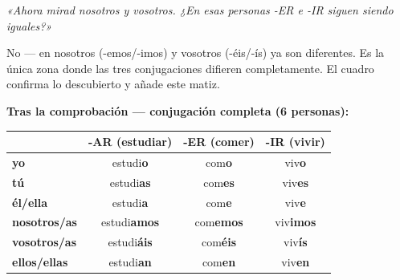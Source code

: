 \documentclass[a4paper,10pt]{article}
\renewcommand{\arraystretch}{1.3}
\newcommand{\raiz}[1]{\textcolor{azulraiz}{#1}}
\newcommand{\termin}[1]{\textcolor{rojofinal}{\textbf{#1}}}
\begin{document}
\vspace{0.3cm}

\begin{preguntabox}
\centering\large\textit{«Ahora mirad nosotros y vosotros. ¿En esas personas -ER e -IR siguen siendo iguales?»}
\end{preguntabox}

\vspace{0.3cm}

\begin{estrategiabox}
{\small No — en nosotros (-emos/-imos) y vosotros (-éis/-ís) ya son diferentes. Es la única zona donde las tres conjugaciones difieren completamente. El cuadro confirma lo descubierto y añade este matiz.}
\end{estrategiabox}

\vspace{0.4cm}

\noindent\textcolor{azulprincipal}{\textbf{Tras la comprobación — conjugación completa (6 personas):}}

\vspace{0.3cm}

\begin{center}
\renewcommand{\arraystretch}{1.7}
\begin{tabular}{|>{\bfseries}l|c|c|c|}
\hline
\rowcolor{azulprincipal!15}
& \textbf{-AR (estudiar)} & \textbf{-ER (comer)} & \textbf{-IR (vivir)} \\
\hline
yo & \raiz{estudi}\termin{o} & \raiz{com}\termin{o} & \raiz{viv}\termin{o} \\
\hline
\rowcolor{gris}
tú & \raiz{estudi}\termin{as} & \raiz{com}\termin{es} & \raiz{viv}\termin{es} \\
\hline
él/ella & \raiz{estudi}\termin{a} & \raiz{com}\termin{e} & \raiz{viv}\termin{e} \\
\hline
\rowcolor{gris}
nosotros/as & \raiz{estudi}\termin{amos} & \raiz{com}\termin{emos} & \raiz{viv}\termin{imos} \\
\hline
vosotros/as & \raiz{estudi}\termin{áis} & \raiz{com}\termin{éis} & \raiz{viv}\termin{ís} \\
\hline
\rowcolor{gris}
ellos/ellas & \raiz{estudi}\termin{an} & \raiz{com}\termin{en} & \raiz{viv}\termin{en} \\
\hline
\end{tabular}
\end{center}

\vspace{0.3cm}
\end{document}
